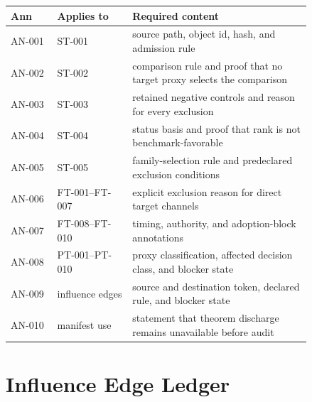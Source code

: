 \documentclass[11pt]{article}
\begin{document}
\begin{center}
\begin{tabular}{p{0.13\linewidth}p{0.21\linewidth}p{0.50\linewidth}}
\textbf{Ann} & \textbf{Applies to} & \textbf{Required content} \\
\hline
AN-001 & ST-001 & source path, object id, hash, and admission rule \\
AN-002 & ST-002 & comparison rule and proof that no target proxy selects the comparison \\
AN-003 & ST-003 & retained negative controls and reason for every exclusion \\
AN-004 & ST-004 & status basis and proof that rank is not benchmark-favorable \\
AN-005 & ST-005 & family-selection rule and predeclared exclusion conditions \\
AN-006 & FT-001--FT-007 & explicit exclusion reason for direct target channels \\
AN-007 & FT-008--FT-010 & timing, authority, and adoption-block annotations \\
AN-008 & PT-001--PT-010 & proxy classification, affected decision class, and blocker state \\
AN-009 & influence edges & source and destination token, declared rule, and blocker state \\
AN-010 & manifest use & statement that theorem discharge remains unavailable before audit \\
\end{tabular}
\end{center}

\section{Influence Edge Ledger}
\end{document}
